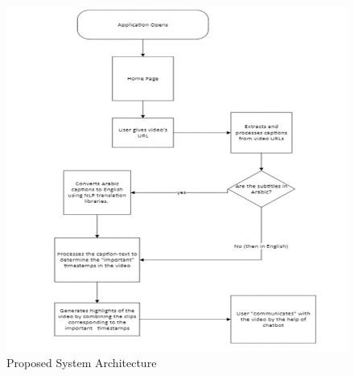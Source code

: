 \documentclass{bscs}
\begin{document}
\begin{figure}[h]
    \centering
    \includegraphics[width=1.0\textwidth]{figure_f.png}  
    \caption{Proposed System Architecture}
    \label{fig:figure4}
\end{figure}
\end{document}
